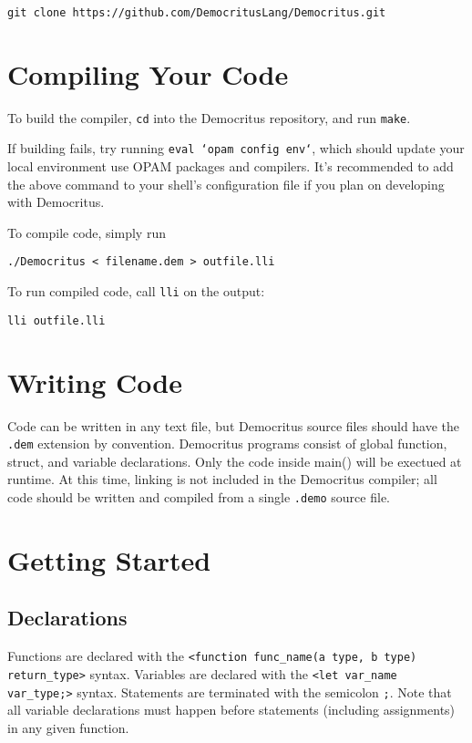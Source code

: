 	\begin{lstlisting}
git clone https://github.com/DemocritusLang/Democritus.git
	\end{lstlisting}


\section{Compiling Your Code}
	
	To build the compiler, \texttt{cd} into the Democritus repository, and run \texttt{make}.

	\medskip \noindent
	If building fails, try running \texttt{eval `opam config env`}, which should update your local environment use OPAM packages and compilers. It's recommended to add the above command to your shell's configuration file if you plan on developing with Democritus.

	\medskip \noindent
	To compile code, simply run
	\begin{lstlisting}
./Democritus < filename.dem > outfile.lli
	\end{lstlisting}

	\noindent To run compiled code, call \texttt{lli} on the output:
	\begin{lstlisting}
lli outfile.lli
	\end{lstlisting}

\section{Writing Code}

	Code can be written in any text file, but Democritus source files should have the \texttt{.dem} extension by convention. Democritus programs consist of global function, struct, and variable declarations. Only the code inside main() will be exectued at runtime. At this time, linking is not included in the Democritus compiler; all code should be written and compiled from a single \texttt{.demo} source file.

\section{Getting Started}

	\subsection{Declarations}
	Functions are declared with the \texttt{<function func\_name(a type, b type) return\_type>} syntax. Variables are declared with the \texttt{<let var\_name var\_type;>} syntax. Statements are terminated with the semicolon \texttt{;}. Note that all variable declarations must happen before statements (including assignments) in any given function.

